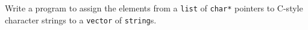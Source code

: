 %
%
\begin{question}
Write a program to assign the elements from a \verb|list| of
\verb|char*| pointers to C-style character strings to a \verb|vector| of \verb|string|s.
\end{question}
